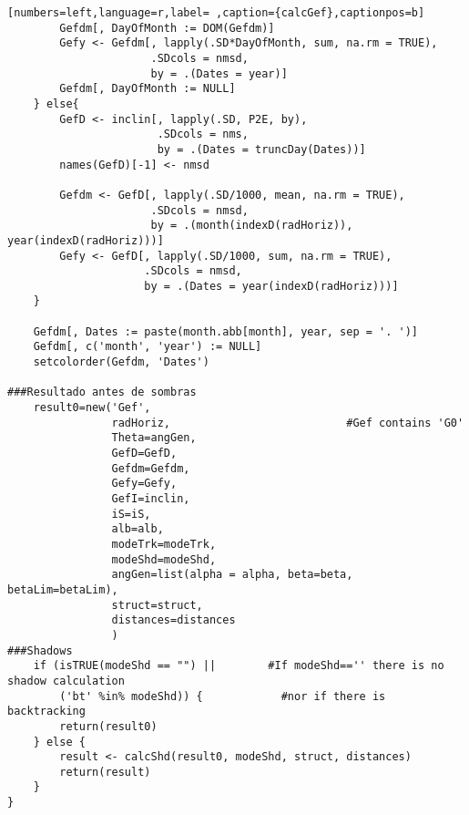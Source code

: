 \begin{lstlisting}[numbers=left,language=r,label= ,caption={calcGef},captionpos=b]
        Gefdm[, DayOfMonth := DOM(Gefdm)]
        Gefy <- Gefdm[, lapply(.SD*DayOfMonth, sum, na.rm = TRUE),
                      .SDcols = nmsd,
                      by = .(Dates = year)]
        Gefdm[, DayOfMonth := NULL]
    } else{
        GefD <- inclin[, lapply(.SD, P2E, by),
                       .SDcols = nms,
                       by = .(Dates = truncDay(Dates))]
        names(GefD)[-1] <- nmsd

        Gefdm <- GefD[, lapply(.SD/1000, mean, na.rm = TRUE),
                      .SDcols = nmsd,
                      by = .(month(indexD(radHoriz)), year(indexD(radHoriz)))]
        Gefy <- GefD[, lapply(.SD/1000, sum, na.rm = TRUE),
                     .SDcols = nmsd,
                     by = .(Dates = year(indexD(radHoriz)))]
    }

    Gefdm[, Dates := paste(month.abb[month], year, sep = '. ')]
    Gefdm[, c('month', 'year') := NULL]
    setcolorder(Gefdm, 'Dates')

###Resultado antes de sombras
    result0=new('Gef',
                radHoriz,                           #Gef contains 'G0'
                Theta=angGen,
                GefD=GefD,
                Gefdm=Gefdm,
                Gefy=Gefy,
                GefI=inclin,
                iS=iS,
                alb=alb,
                modeTrk=modeTrk,
                modeShd=modeShd,
                angGen=list(alpha = alpha, beta=beta, betaLim=betaLim),
                struct=struct,
                distances=distances
                )
###Shadows
    if (isTRUE(modeShd == "") ||        #If modeShd=='' there is no shadow calculation
        ('bt' %in% modeShd)) {            #nor if there is backtracking
        return(result0)
    } else {
        result <- calcShd(result0, modeShd, struct, distances)
        return(result)
    }
}
\end{lstlisting}
